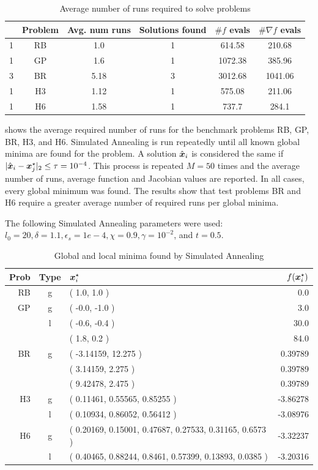 \begin{table}
    \center
    \caption{Average number of runs required to solve problems}
    \label{table:run_numbers}
    \footnotesize
    \begin{tabular}{cc|cccc}
        & Problem & Avg. num runs & Solutions found & $\# f$ evals & $\# \nabla f$ evals \\
        \hline
1 & RB & 1.0 & 1 & 614.58 & 210.68 \\
1 & GP & 1.6 & 1 & 1072.38 & 385.96 \\
3 & BR & 5.18 & 3 & 3012.68 & 1041.06 \\
1 & H3 & 1.12 & 1 & 575.08 & 211.06 \\
1 & H6 & 1.58 & 1 & 737.7 & 284.1 \\
    \end{tabular}

\end{table}
    
 shows the average required number of runs for the benchmark problems RB, GP, BR, H3, and H6. Simulated Annealing is run
repeatedly until all known global minima are found for the problem. A solution $\hat{\boldsymbol{x}}_i$ is considered the same
if $|\hat{\boldsymbol{x}}_i - \boldsymbol{x}^\star_j|_2 \leq \tau = 10^{-4}$.
This process is repeated $M=50$ times
and the average number of runs, average function and Jacobian values are reported. In all cases, every global minimum
was found. The results show that test problems BR and H6 require a greater average number of required runs per global minima. 

The following
Simulated Annealing parameters were used: $l_0=20, \delta=1.1, \epsilon_s=1e-4, \chi=0.9,
\gamma=10^{-2}$, and $t=0.5$.


\begin{table}
    \center
    \caption{Global and local minima found by Simulated Annealing}
    \label{table:minima}
    \footnotesize
    \begin{tabular}{rc|lr}
        Prob & Type & $\boldsymbol{x}^\star_i$ & $f(\boldsymbol{x}^\star_i)$ \\
        \hline
RB & g & ( 1.0, 1.0 ) & 0.0 \\
\hline
GP & g & ( -0.0, -1.0 ) & 3.0 \\
& l &( -0.6, -0.4 ) & 30.0 \\
& & ( 1.8, 0.2 ) & 84.0 \\
\hline
BR & g & ( -3.14159, 12.275 ) & 0.39789 \\
& & ( 3.14159, 2.275 ) & 0.39789 \\
& & ( 9.42478, 2.475 ) & 0.39789 \\
\hline
H3 & g & ( 0.11461, 0.55565, 0.85255 ) & -3.86278 \\
& l &( 0.10934, 0.86052, 0.56412 ) & -3.08976 \\
\hline
H6 & g & ( 0.20169, 0.15001, 0.47687, 0.27533, 0.31165, 0.6573 ) & -3.32237 \\
& l &( 0.40465, 0.88244, 0.8461, 0.57399, 0.13893, 0.0385 ) & -3.20316 \\
\end{tabular}
\end{table}

